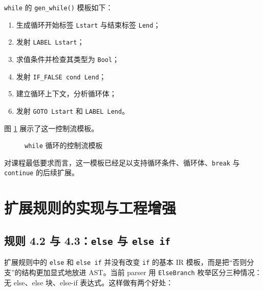 \documentclass[UTF8,a4paper,12pt]{ctexart}
\newcommand{\pkg}[1]{\texttt{#1}}
\newcommand{\op}[1]{\texttt{#1}}
\begin{document}
\pkg{while} 的 \pkg{gen\_while()} 模板如下：

\begin{enumerate}[label=\arabic*.]
    \item 生成循环开始标签 \pkg{Lstart} 与结束标签 \pkg{Lend}；
    \item 发射 \op{LABEL Lstart}；
    \item 求值条件并检查其类型为 \pkg{Bool}；
    \item 发射 \op{IF\_FALSE cond Lend}；
    \item 建立循环上下文，分析循环体；
    \item 发射 \op{GOTO Lstart} 和 \op{LABEL Lend}。
\end{enumerate}

图 \ref{fig:while-template} 展示了这一控制流模板。

\begin{figure}[H]
    \centering
    \caption{\pkg{while} 循环的控制流模板}
    \label{fig:while-template}
\end{figure}

对课程最低要求而言，这一模板已经足以支持循环条件、循环体、\pkg{break} 与 \pkg{continue} 的后续扩展。

\section{扩展规则的实现与工程增强}

\subsection{规则 4.2 与 4.3：\pkg{else} 与 \pkg{else if}}

扩展规则中的 \pkg{else} 和 \pkg{else if} 并没有改变 \pkg{if} 的基本 IR 模板，而是把“否则分支”的结构更加显式地放进 AST。当前 parser 用 \pkg{ElseBranch} 枚举区分三种情况：无 else、else 块、else-if 表达式。这样做有两个好处：
\end{document}
